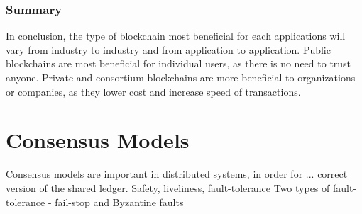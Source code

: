 


\subsubsection*{Summary}
In conclusion, the type of blockchain most beneficial for each applications will vary from industry to industry and from application to application. Public blockchains are most beneficial for individual users, as there is no need to trust anyone. Private and consortium blockchains are more beneficial to organizations or companies, as they lower cost and increase speed of transactions.

\section{Consensus Models} 
Consensus models are important in distributed systems, in order for ... correct version of the shared ledger. 
Safety, liveliness, fault-tolerance
Two types of fault-tolerance - fail-stop and Byzantine faults 





